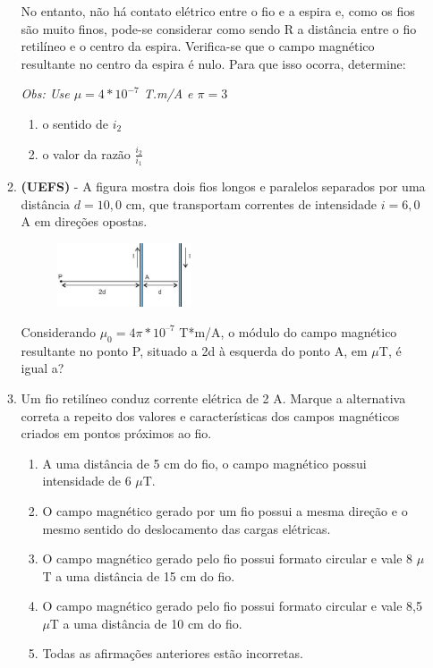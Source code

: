 \documentclass[12pt,letterpaper,fleqn]{article}
\begin{document}
\begin{itemize}
\begin{enumerate}
             No entanto, não há contato elétrico entre o fio e a espira e, como os fios são muito finos, pode-se considerar como sendo R a distância entre o fio retilíneo e o centro da espira. Verifica-se que o campo magnético resultante no centro da espira é nulo. Para que isso ocorra, determine: 
             
             \textit{Obs: Use $\mu=4*10^{-7}$ T.m/A e $\pi=3$}

             \begin{enumerate}
                 \item o sentido de $i_2$
                 \item o valor da razão $\frac{i_2}{i_1}$
             \end{enumerate}
             
             \item \textbf{(UEFS)} - A figura mostra dois fios longos e paralelos separados por uma distância $d = 10,0$ cm, que transportam correntes de intensidade $i = 6,0$ A em direções opostas.
             
             \begin{figure}[h]
                 \centering
                 \includegraphics[width=0.4\textwidth]{ex_12.jpg}
             \end{figure}
             
             Considerando $\mu_0 = 4\pi*10^{–7}$ T*m/A, o módulo do campo magnético resultante no ponto P, situado a 2d à esquerda do ponto A, em $\mu$T, é igual a?
             
             \item Um fio retilíneo conduz corrente elétrica de 2 A. Marque a alternativa correta a repeito dos valores e características dos campos magnéticos criados em pontos próximos ao fio.
             
             \begin{enumerate}
                 \item A uma distância de 5 cm do fio, o campo magnético possui intensidade de 6 $\mu$T.
                 \item O campo magnético gerado por um fio possui a mesma direção e o mesmo sentido do deslocamento das cargas elétricas.
                 \item O campo magnético gerado pelo fio possui formato circular e vale 8 $\mu$T a uma distância de 15 cm do fio.
                 \item O campo magnético gerado pelo fio possui formato circular e vale 8,5 $\mu$T a uma distância de 10 cm do fio.
                 \item  Todas as afirmações anteriores estão incorretas.
             \end{enumerate}
             

\end{enumerate}
\end{itemize}
\end{document}
